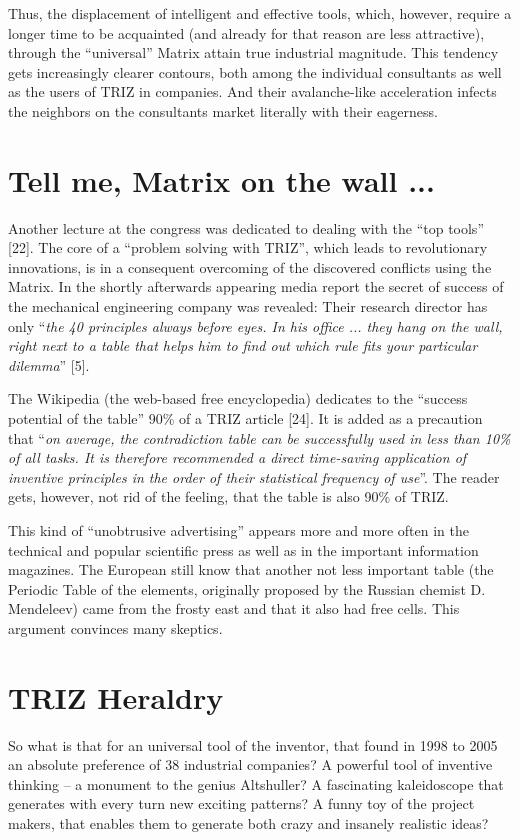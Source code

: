 \documentclass[11pt,a4paper]{article}
\begin{document}
Thus, the displacement of intelligent and effective tools, which, however,
require a longer time to be acquainted (and already for that reason are less
attractive), through the ``universal'' Matrix attain true industrial
magnitude. This tendency gets increasingly clearer contours, both among the
individual consultants as well as the users of TRIZ in companies. And their
avalanche-like acceleration infects the neighbors on the consultants market
literally with their eagerness.

\section*{Tell me, Matrix on the wall ...}
Another lecture at the congress was dedicated to dealing with the ``top
tools'' [22]. The core of a ``problem solving with TRIZ'', which leads to
revolutionary innovations, is in a consequent overcoming of the discovered
conflicts using the Matrix. In the shortly afterwards appearing media report
the secret of success of the mechanical engineering company was revealed:
Their research director has only ``\emph{the 40 principles always before eyes.
  In his office ... they hang on the wall, right next to a table that helps
  him to find out which rule fits your particular dilemma}'' [5].

The Wikipedia (the web-based free encyclopedia) dedicates to the ``success
potential of the table'' 90\% of a TRIZ article [24]. It is added as a
precaution that ``\emph{on average, the contradiction table can be
  successfully used in less than 10\% of all tasks.  It is therefore
  recommended a direct time-saving application of inventive principles in the
  order of their statistical frequency of use}''. The reader gets, however,
not rid of the feeling, that the table is also 90\% of TRIZ.

This kind of ``unobtrusive advertising'' appears more and more often in the
technical and popular scientific press as well as in the important information
magazines. The European still know that another not less important table (the
Periodic Table of the elements, originally proposed by the Russian chemist
D. Mendeleev) came from the frosty east and that it also had free cells. This
argument convinces many skeptics.

\section*{TRIZ Heraldry}
So what is that for an universal tool of the inventor, that found in 1998 to
2005 an absolute preference of 38 industrial companies? A powerful tool of
inventive thinking -- a monument to the genius Altshuller?  A fascinating
kaleidoscope that generates with every turn new exciting patterns?  A funny
toy of the project makers, that enables them to generate both crazy and
insanely realistic ideas?
\end{document}
